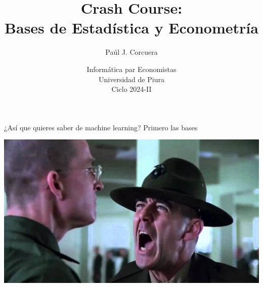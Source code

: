 \documentclass[11pt,handout,aspectratio=169]{beamer}
\begin{document}
	
	\begin{frame}[noframenumbering]{}
		\vspace{0.5cm}
		\title[]{Crash Course: \\ Bases de Estadística y Econometría}
		\author{Paúl J. Corcuera}
		\date{Informática par Economistas \\ Universidad de Piura\\Ciclo 2024-II} 
		\titlepage {\small{}\ }\thispagestyle{empty} \vspace{-30pt}
		
	\end{frame}

\begin{frame}{¿Así que quieres saber de machine learning? Primero las bases }
\begin{center}
\includegraphics[scale=0.4]{stats_bootcamp.png}
\end{center}
\end{frame}
\end{document}
